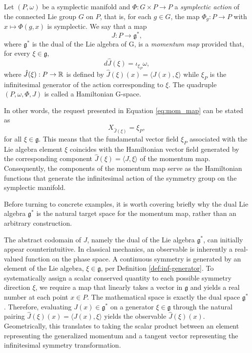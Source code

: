 \begin{definition}\label{def:momentum_mapping}
	Let $(P, \omega)$ be a symplectic manifold and $\Phi: G \times P \to P$ a \emph{symplectic action} of the connected Lie group $G$ on $P$, that is, for each $g \in G$, the map $\Phi_g: P \to P$ with $x \mapsto \Phi(g, x)$ is symplectic. We say that a map
	\[
	J: P \to \mathfrak{g}^*,
	\]
	where $\mathfrak{g}^*$ is the dual of the Lie algebra of G, is a \emph{momentum map} provided that, for every $\xi \in \mathfrak{g}$,
	\begin{equation}
		d\hat{J}(\xi) = \iota_{\xi_P}\omega, \label{eq:mom_map}
	\end{equation}
	where $\hat{J}(\xi): P \to \mathbb{R}$ is defined by $\hat{J}(\xi)(x) = \langle J(x), \xi \rangle$ while $\xi_P$ is the infinitesimal generator of the action corresponding to $\xi$. The quadruple $(P, \omega, \Phi, J)$ is called a Hamiltonian G-space.
\end{definition}

\begin{remark}\label{rmk:momentum_map}
	In other words, the request presented in Equation \eqref{eq:mom_map} can be stated as
	\[
	X_{\hat{J}(\xi)} = \xi_P,
	\]
	for all $\xi \in \mathfrak{g}$. This means that the fundamental vector field $\xi_P$ associated with the Lie algebra element $\xi$ coincides with the Hamiltonian vector field generated by the corresponding component $\hat{J}(\xi) = \langle J, \xi \rangle$ of the momentum map. Consequently, the components of the momentum map serve as the Hamiltonian functions that generate the infinitesimal action of the symmetry group on the symplectic manifold.
\end{remark}

Before turning to concrete examples, it is worth covering briefly why the dual Lie algebra $\mathfrak{g}^*$ is the natural target space for the momentum map, rather than an arbitrary construction.

\begin{remark}
	The abstract codomain of $J$, namely the dual of the Lie algebra $\mathfrak{g}^*$, can initially appear counterintuitive. In classical mechanics, an observable is inherently a real-valued function on the phase space. A continuous symmetry is generated by an element of the Lie algebra, $\xi \in \mathfrak{g}$, per Definition \ref{def:inf-generator}. To systematically assign a scalar conserved quantity to each possible symmetry direction $\xi$, we require a map that linearly takes a vector in $\mathfrak{g}$ and yields a real number at each point $x \in P$. The mathematical space is exactly the dual space $\mathfrak{g}^*$. Therefore, evaluating $J(x) \in \mathfrak{g}^*$ on a generator $\xi \in \mathfrak{g}$ through the natural pairing $\hat{J}(\xi)(x) = \langle J(x) , \xi \rangle$ yields the observable $\hat{J}(\xi)(x)$. Geometrically, this translates to taking the scalar product between an element representing the generalized momentum and a tangent vector representing the infinitesimal symmetry transformation.
\end{remark}

